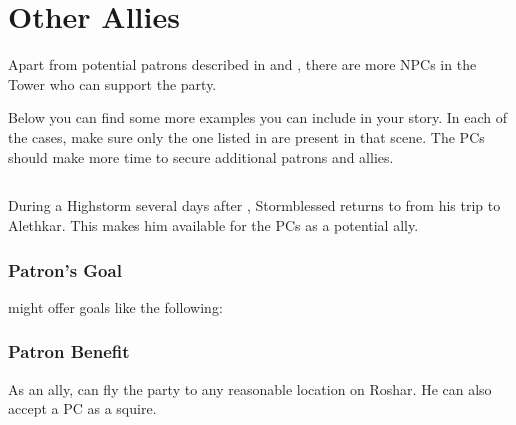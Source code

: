 \section{Other Allies}
\label{sec:moreAllies}

Apart from potential patrons described in  and , there are more NPCs in the Tower who can support the party.

Below you can find some more examples you can include in your story. In each of the cases, make sure only the one listed in  are present in that scene. The PCs should make more time to secure additional patrons and allies.





\subsection{\npcKaladinName{}}

During a Highstorm several days after , \npcKaladin{} Stormblessed returns to \locationUrithiru{} from his trip to Alethkar. This makes him available for the PCs as a potential ally.

\subsubsection{Patron's Goal}

\npcKaladin{} might offer goals like the following:


\subsubsection{Patron Benefit}

As an ally, \npcKaladin{} can fly the party to any reasonable location on Roshar. He can also accept a PC as a squire.


